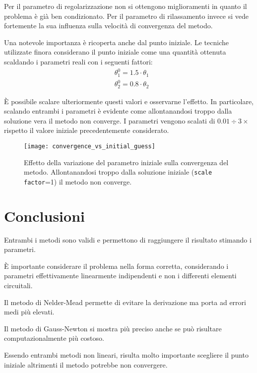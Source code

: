 Per il parametro di regolarizzazione non si ottengono miglioramenti in quanto il problema è già ben condizionato. Per il parametro di rilassamento invece si vede fortemente la sua influenza sulla velocità di convergenza del metodo. 

Una notevole importanza è ricoperta anche dal punto iniziale. 
Le tecniche utilizzate finora considerano il punto iniziale come una quantità ottenuta scaldando i parametri reali con i seguenti fattori:
\begin{equation}
	\begin{aligned}
		&\theta_1^{0}=1.5\cdot \theta_1\\
		& \theta_2^{0}=0.8\cdot \theta_2
	\end{aligned}
\end{equation}

È possibile scalare ulteriormente questi valori e osservarne l'effetto. In particolare, scalando entrambi i parametri è evidente come allontanandosi troppo dalla soluzione vera il metodo non converge. I parametri vengono scalati di $0.01 \div 3 \times$ rispetto il valore iniziale precedentemente considerato.   


\begin{figure}[bt]
	\centering
	\texttt{[image: convergence\_vs\_initial\_guess]}
	\caption{Effetto della variazione del parametro iniziale sulla convergenza del metodo. Allontanandosi troppo dalla soluzione iniziale (\texttt{scale factor}=1) il metodo non converge.}
\end{figure}


\section{Conclusioni}

Entrambi i metodi sono validi e permettono di raggiungere il risultato stimando i parametri.

È importante considerare il problema nella forma corretta, considerando i parametri effettivamente linearmente indipendenti e non i differenti elementi circuitali.

Il metodo di Nelder-Mead permette di evitare la derivazione ma porta ad errori medi più elevati. 

Il metodo di Gauss-Newton si mostra più preciso anche se può risultare computazionalmente più costoso. 

Essendo entrambi metodi non lineari, risulta molto importante scegliere il punto iniziale altrimenti il metodo potrebbe non convergere. 


